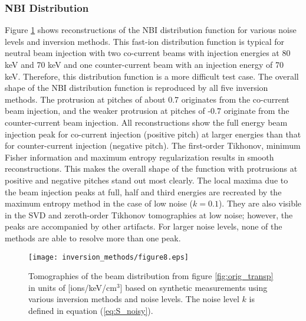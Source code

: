 \subsubsection{NBI Distribution}
Figure \ref{fig:tomos_transp} shows reconstructions of the NBI distribution function for various noise levels and inversion methods.
This fast-ion distribution function is typical for neutral beam injection with two co-current beams with injection energies at 80 keV and 70 keV and one counter-current beam with an injection energy of 70 keV. 
Therefore, this distribution function is a more difficult test case. 
The overall shape of the NBI distribution function is reproduced by all five inversion methods. The protrusion at pitches of about 0.7 originates from the co-current beam injection, and the weaker protrusion at pitches of -0.7 originate from the counter-current beam injection. All reconstructions show the full energy beam injection peak for co-current injection (positive pitch) at larger energies than that for counter-current injection (negative pitch). 
The first-order Tikhonov, minimum Fisher information and maximum entropy regularization results in smooth reconstructions. This makes the overall shape of the function with protrusions at positive and negative pitches stand out most clearly. 
The local maxima due to the beam injection peaks at full, half and third energies are recreated by the maximum entropy method in the case of low noise ($k=0.1$). They are also visible in the SVD and zeroth-order Tikhonov tomographies at low noise; however, the peaks are accompanied by other artifacts.
For larger noise levels, none of the methods are able to resolve more than one peak.
\begin{figure}[h!]
    \centering
    \texttt{[image: inversion\_methods/figure8.eps]}
    \caption{Tomographies of the beam distribution from figure \ref{fig:orig_transp} in units of [ions/keV/cm$^3$] based on synthetic measurements using various inversion methods and noise levels. The noise level $k$ is defined in equation (\ref{eq:S_noisy}).} \label{fig:tomos_transp}
\end{figure}

